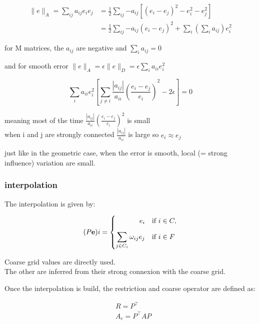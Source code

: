 \documentclass{article}
\begin{document}
\begin{align*}
    \|e\|_A = \sum_{ij}{a_{ij}e_i e_j} & = \frac{1}{2} \sum_{ij}{-a_{ij}\left[{(e_i - e_j)}^2 - e_i^2 - e_j^2\right]} \\ 
                                       & = \frac{1}{2} \sum_{ij}{-a_{ij}{\left(e_i - e_j\right)}^2} + \sum_{i}{\left(\sum_{i}{a_{ij}}\right)e_i^2 }
\end{align*}

for M matrices, the $a_{ij}$ are negative and $ \sum_{i}{a_{ij}} = 0$

and for smooth error $\|e\|_{A} = \epsilon \|e\|_{D} = \epsilon \sum_{i}{a_{ii}e_i^2}$

\[
    \sum_{i}{a_{ii}e_i^2}\left[ \sum_{j \neq i}{\frac{|a_{ij}|}{a_{ii}} \left(\frac{e_i - e_j}{e_i}\right)}^2 - 2\epsilon \right] = 0
\]

meaning most of the time $ \frac{|a_{ij}|}{a_{ii}} {\left(\frac{e_i - e_j}{e_i}\right)}^2 $ is small \\
when i and j are strongly connected $ \frac{|a_{ij}|}{a_{ii}} $ is large so $e_i \approx e_j $

just like in the geometric case, when the error is smooth, local (= strong influence) variation are small.

\subsubsection*{interpolation}

The interpolation is given by:

\begin{equation*}
    {(P \mathbf{e})}i = 
    \begin{cases}
        \hfill e_i & \text{if } i \in C, \\[8pt]
        \displaystyle \sum_{j \in C_i} \omega_{ij} e_j & \text{if } i \in F
    \end{cases}
\end{equation*}

Coarse grid values are directly used. \\
The other are inferred from their strong connexion with the coarse grid.

Once the interpolation is build, the restriction and coarse operator are defined as:

\begin{align*}
      & R = P^{\top} \\ 
      & A_{c} = P^{\top}AP
\end{align*}
\end{document}
